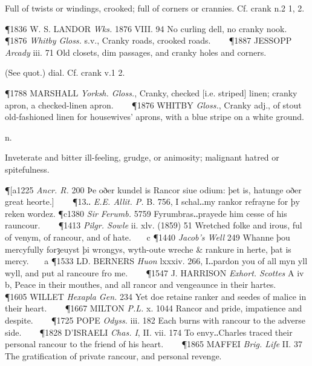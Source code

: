 \begin{description}[wide, labelwidth=!, labelindent=0pt]
\begin{myenumerate}
 Full of twists or windings, crooked; full of corners or crannies. Cf. crank n.2 1, 2.

\P 1836 W. S. LANDOR  \textit{Wks.} 1876 VIII.  94 No curling dell, no cranky nook.    
\P 1876  \textit{Whitby Gloss.} s.v., Cranky roads, crooked roads.    
\P 1887 JESSOPP  \textit{Arcady} iii. 71 Old closets, dim passages, and cranky holes and corners.

 (See quot.) dial. Cf. crank v.1 2.

\P 1788 MARSHALL  \textit{Yorksh. Gloss.}, Cranky, checked [i.e. striped] linen; cranky apron, a checked-linen apron.    
\P 1876 WHITBY  \textit{Gloss.}, Cranky adj., of stout old-fashioned linen for housewives' aprons, with a blue stripe on a white ground.
\end{myenumerate}


 n.

\noindent {}

\vspace{-0.3cm}

\begin{myenumerate}

 Inveterate and bitter ill-feeling, grudge, or animosity; malignant hatred or spitefulness.

\P [a1225  \textit{Ancr. R.} 200 Þe oðer kundel is Rancor siue odium: þet is, hatunge oðer great heorte.]    
\P 13‥ \textit{E.E. Allit. P.} B. 756, I schal‥my rankor refrayne for þy reken wordez.
\P c1380  \textit{Sir Ferumb.} 5759 Fyrumbras‥prayede him cesse of his rauncour.    
\P 1413  \textit{Pilgr. Sowle} ii. xlv. (1859) 51 Wretched folke and irous, ful of venym, of rancour, and of hate.    c 
\P 1440  \textit{Jacob's Well} 249 Whanne þou mercyfully forȝeuyst þi wrongys, wyth-oute wreche \& rankure in herte, þat is mercy.    a 
\P 1533 LD. BERNERS  \textit{Huon} lxxxiv. 266, I‥pardon you of all myn yll wyll, and put al rancoure fro me.    
\P 1547 J. HARRISON  \textit{Exhort. Scottes} A iv b, Peace in their mouthes, and all rancor and vengeaunce in their hartes.    
\P 1605 WILLET  \textit{Hexapla Gen.} 234 Yet doe retaine ranker and seedes of malice in their heart.    
\P 1667 MILTON  \textit{P.L.} x. 1044 Rancor  and pride, impatience and despite.    
\P 1725 POPE  \textit{Odyss.} iii. 182 Each burns with rancour to the adverse side.    
\P 1828 D'ISRAELI  \textit{Chas. I}, II. vii. 174 To envy‥Charles traced their personal rancour to the friend of his heart.    
\P 1865 MAFFEI  \textit{Brig. Life} II. 37 The gratification of private rancour, and personal revenge.


\end{myenumerate}
\end{description}
